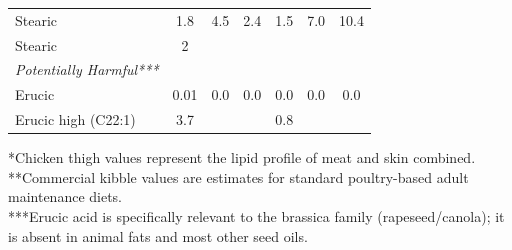 \begin{table}[h!]
\begin{tabular}{l *{6}{S[table-format=2.1]}}
        Stearic  & 1.8 & 4.5 & 2.4 & 1.5 & 7.0 & 10.4 \\
        Stearic  & 2\cite{ElNakhlawy_Shiboob_Ux062a_char_2011} & & & & & \\
        \midrule
        \textit{Potentially Harmful***} & & & & & & \\
        Erucic  & 0.01 & 0.0 & 0.0 & 0.0 & 0.0 & 0.0 \\
        Erucic high  (C22:1)  &3.7\cite{Haq_Saeed_Ahmed_Chemical_analysis_characterization_2009}  &  &  & 0.8 \cite{Ozbay_Determination_fatty_acid_2026} &  &  \\
        \bottomrule
    \end{tabular}
    \par\bigskip
    \footnotesize
    *Chicken thigh values represent the lipid profile of meat and skin combined.\\
    **Commercial kibble values are estimates for standard poultry-based adult maintenance diets.\\
    ***Erucic acid is specifically relevant to the brassica family (rapeseed/canola); it is absent in animal fats and most other seed oils.
\end{table}

